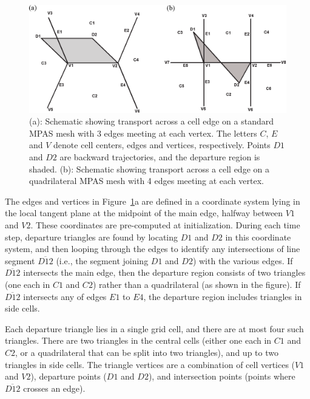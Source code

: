 \begin{figure}[]
\centering
\includegraphics[width=1.0\textwidth]{seaice/ir_diagram.eps}
\caption{(a): Schematic showing transport across a cell edge on a standard MPAS mesh with 3 edges meeting at each vertex. The letters $C$, $E$ and $V$ denote cell centers, edges and vertices, respectively. Points $D1$ and $D2$ are backward trajectories, and the departure region is shaded. (b): Schematic showing transport across a cell edge on a quadrilateral MPAS mesh with 4 edges meeting at each vertex.}
\label{fig:IR_geom}
\end{figure}

The edges and vertices in Figure~\ref{fig:IR_geom}a are defined in a coordinate system lying in the local tangent plane at the midpoint of the main edge, halfway between $V1$ and $V2$. These coordinates are pre-computed at initialization. During each time step, departure triangles are found by locating $D1$ and $D2$ in this coordinate system, and then looping through the edges to identify any intersections of line segment $\overline{D12}$ (i.e., the segment joining $D1$ and $D2$) with the various edges. If $\overline{D12}$ intersects the main edge, then the departure region consists of two triangles (one each in $C1$ and $C2$) rather than a quadrilateral (as shown in the figure). If $\overline{D12}$ intersects any of edges $E1$ to $E4$, the departure region includes triangles in side cells.

Each departure triangle lies in a single grid cell, and there are at most four such triangles. There are two triangles in the central cells (either one each in $C1$ and $C2$, or a quadrilateral that can be split into two triangles), and up to two triangles in side cells. The triangle vertices are a combination of cell vertices ($V1$ and $V2$), departure points ($D1$ and $D2$), and intersection points (points where $\overline{D12}$ crosses an edge).

